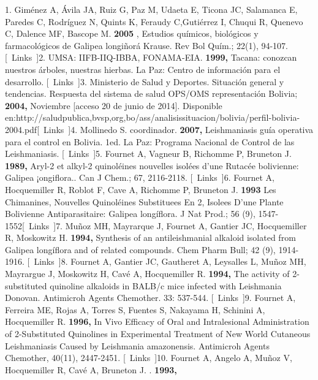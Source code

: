 \documentclass{article}
\begin{document}
{}{1. Giménez A, Ávila JA, Ruiz G, Paz M, Udaeta E, Ticona JC, Salamanca E, Paredes C, Rodríguez N, Quints K, Feraudy C,}{Gutiérrez I, Chuqui R, Quenevo C, Dalence MF, Bascope M. \renewcommand{\children}{2005}\textbf{\children}
, Estudios químicos, biológicos y farmacológicos de Galipea longiñorá Krause. Rev Bol Quím.; 22(1), 94-107.    [ Links ]}{2. UMSA: IIFB-IIQ-IBBA, FONAMA-EIA. \renewcommand{\children}{1999, }\textbf{\children}
Tacana: conozcan nuestros árboles, nuestras hierbas. La Paz: Centro de información para el desarrollo.    [ Links ]}{3. Ministerio de Salud y Deportes. Situación general y tendencias. Respuesta del sistema de salud OPS/OMS representación Bolivia; \renewcommand{\children}{2004, }\textbf{\children}
Noviembre [acceso 20 de junio de 2014]. Disponible }{en:}{http://saludpublica,bvsp,org,bo/ass/analisissituacion/bolivia/perfil-bolivia-2004.pdf}[ Links ]{4.  Mollinedo S. coordinador. \renewcommand{\children}{2007, }\textbf{\children}
Leishmaniasis guía operativa para el control en Bolivia. 1ed. La Paz: Programa Nacional de Control de las Leishmaniasis.    [ Links ]}{5.  Fournet A, Vagneur B, Richomme P, Bruneton J. \renewcommand{\children}{1989, }\textbf{\children}
Aryl-2 et alkyl-2 quinoléines nouvelles isolées d'une Rutacée bolivienne: Galipea ¡ongiflora.. Can J Chem.; 67, 2116-2118.    [ Links ]}{6. Fournet A, Hocquemiller R, Roblot F, Cave A, Richomme P, Bruneton J. \renewcommand{\children}{1993 }\textbf{\children}
Les Chimanines, Nouvelles Quinoléines Substituees En 2, Isolees D'une Plante Bolivienne Antiparasitaire: Galipea longíflora. J Nat Prod.; 56 (9), 1547-1552}[ Links ]{7. Muñoz MH, Mayrarque J, Fournet A, Gantier JC, Hocquemiller R, Moskowitz H. \renewcommand{\children}{1994, }\textbf{\children}
Synthesis of an antileishmanial alkaloid isolated from Galipea longíflora and of related compounds. Chem Pharm Bull; 42 (9), 1914-1916.    [ Links ]}{8. Fournet A, Gantier JC, Gautheret A, Leysalles L, Muñoz MH, Mayrargue J, Moskowitz H, Cavé A, Hocquemiller R. \renewcommand{\children}{1994, }\textbf{\children}
The activity of 2-substituted quinoline alkaloids in BALB/c mice infected with Leishmania Donovan. Antimicroh Agents Chemother. 33: 537-544.    [ Links ]}{9. Fournet A, Ferreira ME, Rojas A, Torres S, Fuentes S, Nakayama H, Schinini A, Hocquemiller R. \renewcommand{\children}{1996, }\textbf{\children}
In Vivo Efficacy of Oral and Intralesional Administration of 2-Substituted Quinolines in Experimental Treatment of New World Cutaneous Leishmaniasis Caused by Leishmania amazonensis. Antimicroh Agents Chemother, 40(11), 2447-2451.    [ Links ]}{10. Fournet A, Angelo A, Muñoz V, Hocquemiller R, Cavé A, Bruneton J. . \renewcommand{\children}{1993, }\textbf{\children}
}
\end{document}
